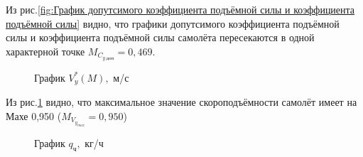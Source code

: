 Из рис.\ref{fig:График допутсимого коэффициента подъёмной силы и коэффициента подъёмной силы} видно, что графики допутсимого коэффициента подъёмной силы и коэффициента подъёмной силы самолёта пересекаются в одной характерной точке $M_{C_{y \ \text{доп}}} = 0,469$.

\begin{figure}[H]
    \caption{График $V_{y}^*(M),$ м/с}
    \label{fig:График Vy}
\end{figure}

Из рис.\ref{fig:График Vy} видно, что максимальное значение скороподъёмности самолёт имеет на Махе 0,950 ($M_{V_{y_{max}}} = 0,950$)

\begin{figure}[H]
    \caption{График $q_\text{ч}, $ кг/ч}
    \label{fig:График qh}
\end{figure}


